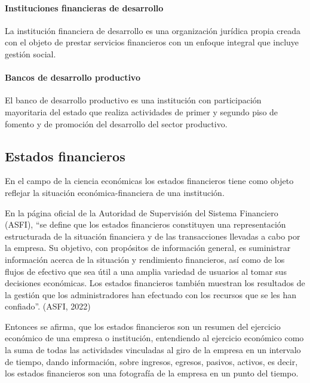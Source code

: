 \documentclass[
  12pt,
]{article}
\begin{document}
\hypertarget{instituciones-financieras-de-desarrollo}{%
\paragraph{Instituciones financieras de
desarrollo}\label{instituciones-financieras-de-desarrollo}}

La institución financiera de desarrollo es una organización jurídica
propia creada con el objeto de prestar servicios financieros con un
enfoque integral que incluye gestión social.

\hypertarget{bancos-de-desarrollo-productivo}{%
\paragraph{Bancos de desarrollo
productivo}\label{bancos-de-desarrollo-productivo}}

El banco de desarrollo productivo es una institución con participación
mayoritaria del estado que realiza actividades de primer y segundo piso
de fomento y de promoción del desarrollo del sector productivo.

\hypertarget{estados-financieros}{%
\subsection{Estados financieros}\label{estados-financieros}}

En el campo de la ciencia económicas los estados financieros tiene como
objeto reflejar la situación económica-financiera de una institución.

En la página oficial de la Autoridad de Supervisión del Sistema
Financiero (ASFI), ``se define que los estados financieros constituyen
una representación estructurada de la situación financiera y de las
transacciones llevadas a cabo por la empresa. Su objetivo, con
propósitos de información general, es suministrar información acerca de
la situación y rendimiento financieros, así como de los flujos de
efectivo que sea útil a una amplia variedad de usuarios al tomar sus
decisiones económicas. Los estados financieros también muestran los
resultados de la gestión que los administradores han efectuado con los
recursos que se les han confiado''. (ASFI, 2022)

Entonces se afirma, que los estados financieros son un resumen del
ejercicio económico de una empresa o institución, entendiendo al
ejercicio económico como la suma de todas las actividades vinculadas al
giro de la empresa en un intervalo de tiempo, dando información, sobre
ingresos, egresos, pasivos, activos, es decir, los estados financieros
son una fotografía de la empresa en un punto del tiempo.
\end{document}
